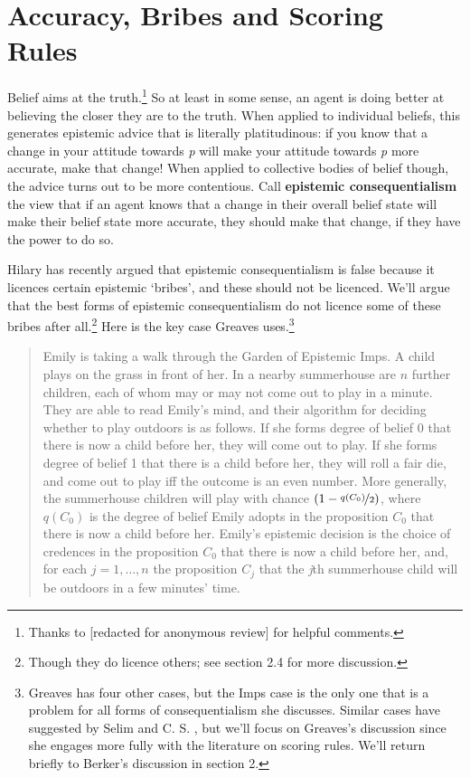 
\section{Accuracy, Bribes and Scoring Rules}
\label{accuracybribesandscoringrules}

Belief aims at the truth.\footnote{Thanks to [redacted for anonymous review] for helpful comments.} So at least in some sense, an agent is doing better at believing the closer they are to the truth. When applied to individual beliefs, this generates epistemic advice that is literally platitudinous: if you know that a change in your attitude towards \emph{p} will make your attitude towards \emph{p} more accurate, make that change! When applied to collective bodies of belief though, the advice turns out to be more contentious. Call \textbf{epistemic consequentialism} the view that if an agent knows that a change in their overall belief state will make their belief state more accurate, they should make that change, if they have the power to do so.

Hilary  \citet{Greaves2013} has recently argued that epistemic consequentialism is false because it licences certain epistemic `bribes', and these should not be licenced. We'll argue that the best forms of epistemic consequentialism do not licence some of these bribes after all.\footnote{Though they do licence others; see section 2.4 for more discussion.} Here is the key case Greaves uses.\footnote{Greaves has four other cases, but the Imps case is the only one that is a problem for all forms of consequentialism she discusses. Similar cases have suggested by Selim  \citet{Berker2013b, Berker2013a} and C. S.  \citet{Jenkins2007}, but we'll focus on Greaves's discussion since she engages more fully with the literature on scoring rules. We'll return briefly to Berker's discussion in section 2.}

\begin{quote}

Emily is taking a walk through the Garden of Epistemic Imps. A child plays on the grass in front of her. In a nearby summerhouse are $n$ further children, each of whom may or may not come out to play in a minute. They are able to read Emily's mind, and their algorithm for deciding whether to play outdoors is as follows. If she forms degree of belief 0 that there is now a child before her, they will come out to play. If she forms degree of belief 1 that there is a child before her, they will roll a fair die, and come out to play iff the outcome is an even number. More generally, the summerhouse children will play with chance $(1-\nicefrac{q(C_0)}{2})$, where $q(C_0)$ is the degree of belief Emily adopts in the proposition $C_0$ that there is now a child before her. Emily’s epistemic decision is the choice of credences in the proposition $C_0$ that there is now a child before her, and, for each $j = 1, \ldots, n$ the proposition $C_j$ that the \emph{j}th summerhouse child will be outdoors in a few minutes' time.
\end{quote}

